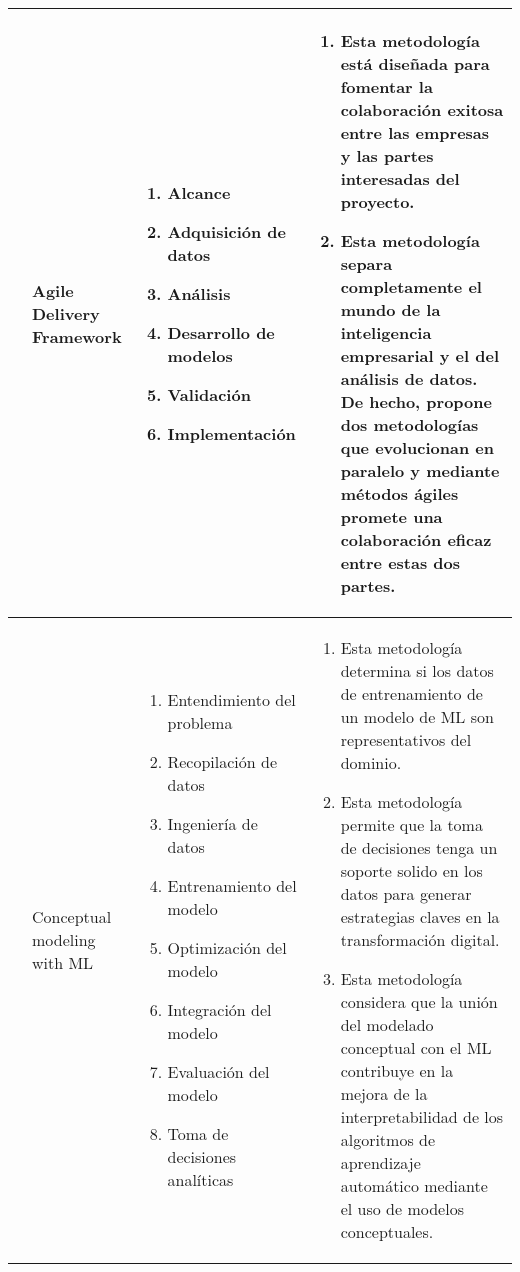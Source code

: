 \begin{table*} [!htb]
	\footnotesize
	\begin{threeparttable}	
		\begin{tabular}{p{1cm} p{2cm} p{5cm} p{6.5cm}} \toprule
			\cite{Larson2016}
			&Agile Delivery Framework
			&  \begin{enumerate}
				\item Alcance
				\item Adquisición de datos
				\item Análisis
				\item Desarrollo de modelos
				\item Validación
				\item Implementación 
			\end{enumerate}
			& \begin{enumerate}
				\item Esta metodología está diseñada para fomentar la colaboración exitosa entre las empresas y las partes interesadas del proyecto.
				\item Esta metodología separa completamente el mundo de la inteligencia empresarial y el del análisis de datos. De hecho, propone dos metodologías que evolucionan en paralelo y mediante métodos ágiles promete una colaboración eficaz entre estas dos partes.
			\end{enumerate}
			\\ \hline
			\cite{Maass2021}
			&Conceptual modeling with ML
			&  \begin{enumerate}
				\item Entendimiento del problema
				\item Recopilación de datos
				\item Ingeniería de datos
				\item Entrenamiento del modelo
				\item Optimización del modelo
				\item Integración del modelo
				\item Evaluación del modelo
				\item Toma de decisiones analíticas   
			\end{enumerate}
			& \begin{enumerate}
				\item Esta metodología determina si los datos de entrenamiento de un modelo de ML son representativos del dominio.
				\item Esta metodología permite que la toma de decisiones tenga un soporte solido en los datos para generar estrategias claves en la transformación digital.
				\item Esta metodología considera que la unión del modelado conceptual con el ML contribuye en la mejora de la interpretabilidad de los algoritmos de aprendizaje automático mediante el uso de modelos conceptuales.
			\end{enumerate}
			\\ \hline
			

\end{tabular}
\end{threeparttable}
\end{table*}
